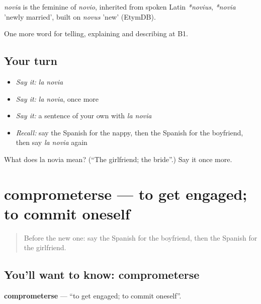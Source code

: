 \begin{cousinweb}
\emph{novia} is the feminine of \emph{novio}, inherited from spoken Latin \emph{*novius}, \emph{*novia} 'newly married', built on \emph{novus} 'new' (EtymDB).
\end{cousinweb}

\begin{grammarlens}[title={What you've built}]
One more word for telling, explaining and describing at B1.
\end{grammarlens}

\subsection*{Your turn}
\begin{itemize}
\raggedright
  \item \emph{Say it:} \emph{la novia}
  \item \emph{Say it:} \emph{la novia}, once more
  \item \emph{Say it:} a sentence of your own with \emph{la novia}
  \item \emph{Recall:} say the Spanish for the nappy, then the Spanish for the boyfriend, then say \emph{la novia} again
\end{itemize}

\begin{tcolorbox}[breakable,colback=teal!4,colframe=teal!35!black,title={Before you move on}]
What does la novia mean? (\textquotedblleft{}The girlfriend; the bride\textquotedblright{}.) Say it once more.
\end{tcolorbox}
\section[comprometerse]{comprometerse — to get engaged; to commit oneself}

\label{lesson:ES-C547-comprometerse}



\begin{quote}
Before the new one: say the Spanish for the boyfriend, then the Spanish for the girlfriend.
\end{quote}

\subsection*{You'll want to know: comprometerse}
\textbf{comprometerse} — \textquotedblleft{}to get engaged; to commit oneself\textquotedblright{}.

